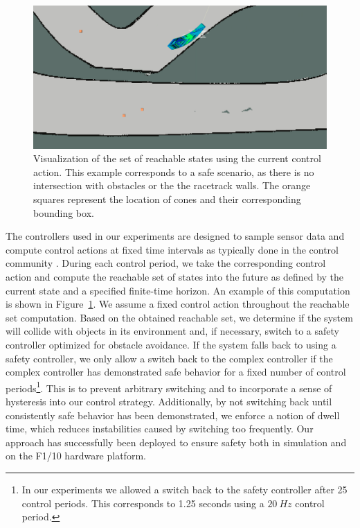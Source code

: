 \documentclass[manuscript,screen,review]{acmart}
\begin{document}
 
\begin{figure}[htpb]%
  \centering
    \includegraphics[width=0.7\linewidth]{figures/reach_vis_one.png}
   \caption{Visualization of the set of reachable states using the current control action. This example corresponds to a safe scenario, as there is no intersection with obstacles or the the racetrack walls. The orange squares represent the location of cones and their corresponding bounding box.}
  \label{fig:reachset}
\end{figure}

The controllers used in our experiments are designed to sample sensor data and compute control actions at fixed time intervals as typically done in the control community \cite{Dai2020}. During each control period, we take the corresponding control action and compute the reachable set of states into the future as defined by the current state and a specified finite-time horizon. An example of this computation is shown in Figure~\ref{fig:reachset}. We assume a fixed control action throughout the reachable set computation. Based on the obtained reachable set, we determine if the system will collide with objects in its environment and, if necessary, switch to a safety controller optimized for obstacle avoidance. If the system falls back to using a safety controller, we only allow a switch back to the complex controller if the complex controller has demonstrated safe behavior for a fixed number of control periods\footnote{In our experiments we allowed a switch back to the safety controller after 25 control periods. This corresponds to 1.25 seconds using a $20\ Hz$ control period.}. This is to prevent arbitrary switching and to incorporate a sense of hysteresis into our control strategy. Additionally, by not switching back until consistently safe behavior has been demonstrated, we enforce a notion of dwell time, which reduces instabilities caused by switching too frequently. Our approach has successfully been deployed to ensure safety both in simulation and on the F1/10 hardware platform.
\end{document}
